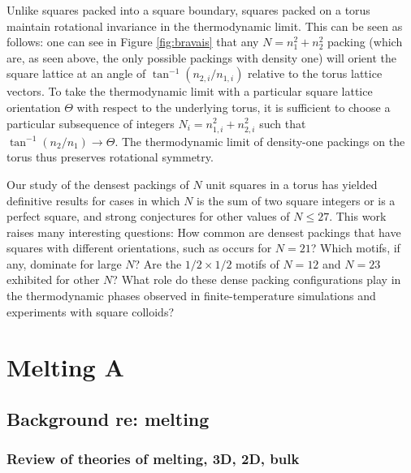 \documentclass{umthesis}          %
\begin{document}
Unlike squares packed into a square boundary, squares packed on a torus maintain rotational invariance in the thermodynamic limit.  This can be seen as follows: one can see in Figure \ref{fig:bravais} that any $N=n_1^2+n_2^2$ packing (which are, as seen above, the only possible packings with density one) will orient the square lattice at an angle of $\tan^{-1}(n_{2,i}/n_{1,i})$ relative to the torus lattice vectors.  To take the thermodynamic limit with a particular square lattice orientation $\Theta$ with respect to the underlying torus, it is sufficient to choose a particular subsequence of integers $N_i=n_{1,i}^2+n_{2,i}^2$ such that 
$\tan^{-1}(n_2/n_1) \rightarrow \Theta$.
The thermodynamic limit of density-one packings on the torus thus preserves rotational symmetry.


Our study of the densest packings of $N$ unit squares in a torus has yielded definitive results for cases in which $N$ is the sum of two square integers or is a perfect square, and strong conjectures for other values of $N \le 27$.  This work raises many interesting questions: How common are densest packings that have squares with different orientations, such as occurs for $N=21$?  Which motifs, if any, dominate for large $N$?  Are the $1/2 \times 1/2$ motifs of $N=12$ and $N=23$ exhibited for other $N$? What role do these dense packing configurations play in the thermodynamic phases observed in finite-temperature simulations and experiments with square colloids?



\chapter{Melting A}

\label{sec-2}

\section{Background re: melting}
\label{sec-2.1}

\subsection{Review of theories of melting, 3D, 2D, bulk}
\label{sec-2.1.1}
\end{document}
